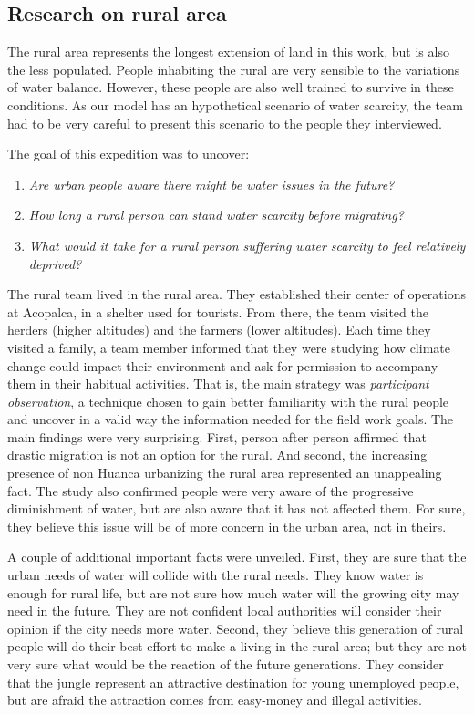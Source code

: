 \documentclass{article}
\begin{document}
\subsection{Research on rural area}

The rural area represents the longest extension of land in this work, but is also the less populated. People inhabiting the rural are very sensible to the variations of water balance. However, these people are also well trained to survive in these conditions.  As our model has an hypothetical scenario of water scarcity, the team had to be very careful to present this scenario to the people they interviewed. 

The goal of this expedition was to uncover:
\begin{enumerate}
\item \emph{Are urban people aware there might be water issues in the future?}
\item \emph{How long a rural person can stand water scarcity before migrating?}
\item \emph{What would it take for a rural person suffering water scarcity to feel relatively deprived?}
\end {enumerate}


The rural team lived in the rural area. They established their center of operations at Acopalca, in a shelter used for tourists. From there, the team visited the herders (higher altitudes) and the farmers (lower altitudes). Each time they visited a family, a team member informed that they were studying how climate change could impact their environment and ask for permission to accompany them in their habitual activities. That is, the main strategy was \emph{participant observation}, a technique chosen to gain better familiarity with the rural people and uncover in a valid way the information needed for the field work goals. The main findings were very surprising. First, person after person affirmed that drastic migration is not an option for the rural. And second, the increasing presence of non Huanca urbanizing the rural area represented an unappealing fact. The study also confirmed people were very aware of the progressive diminishment of water, but are also aware that it has not affected them. For sure, they believe this issue will be of more concern in the urban area, not in theirs.

A couple of additional important facts were unveiled. First, they are sure that the urban needs of water will collide with the rural needs. They know water is enough for rural life, but are not sure how much water will the growing city may need in the future. They are not confident local authorities will consider their opinion if the city needs more water. Second, they believe this generation of rural people will do their best effort to make a living in the rural area; but they are not very sure what would be the reaction of the future generations. They consider that the jungle represent an attractive destination for young unemployed people, but are afraid the attraction comes from easy-money and illegal activities.
\end{document}
